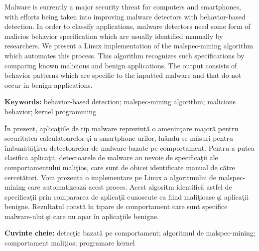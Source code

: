 
Malware is currently a major security threat for computers and smartphones, with efforts being taken into improving malware detectors with behavior-based detection. In order to classify applications, malware detectors need some form of malicios behavior specification which are usually identified manually by researchers. We present a Linux implementation of the malspec-mining algorithm which automates this process. This algorithm recognizes such specifications by comparing known malicious and benign applications. The output consists of behavior patterns which are specific to the inputted malware and that do not occur in benign applications.

\textbf{Keywords:} behavior-based detection; malspec-mining algorithm; malicious behavior; kernel programming

\vspace*{2cm}

În prezent, aplicaţiile de tip malware reprezintă o ameninţare majoră pentru securitatea calculatoarelor şi a smartphone-urilor, luându-se măsuri pentru îmbunătăţirea detectoarelor de malware bazate pe comportament. Pentru a putea clasifica aplicaţii, detectoarele de malware au nevoie de specificaţii ale comportamentului maliţios, care sunt de obicei identificate manual de către cercetători. Vom prezenta o implementare pe Linux a algoritmului de malspec-mining care automatizează acest proces. Acest algoritm identifică astfel de specificaţii prin compararea de aplicaţii cunoscute ca fiind maliţioase şi aplicaţii benigne. Rezultatul constă în tipare de comportament care sunt specifice malware-ului şi care nu apar în aplicaţiile benigne.

\textbf{Cuvinte cheie:} detecţie bazată pe comportament; algoritmul de malspec-mining; comportament maliţios; programare kernel